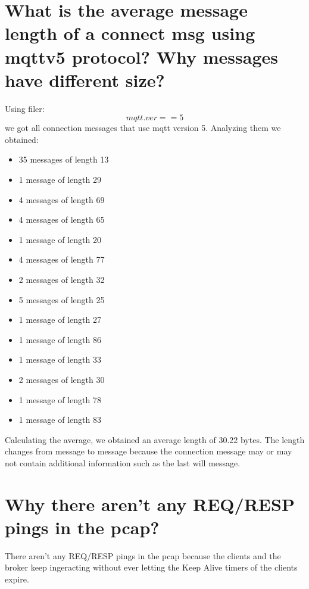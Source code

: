 \documentclass{article}
\begin{document}
\section{What is the average message length of a connect msg
using mqttv5 protocol? Why messages have different
size?}
Using filer: \[ mqtt.ver == 5\] we got all connection messages that use mqtt version 5. \hfill \break
Analyzing them we obtained: 
\begin{itemize} 
   \item 35 messages of length 13
   \item 1 message of length 29
   \item 4 messages of length 69
   \item 4 messages of length 65
   \item 1 message of length 20
   \item 4 messages of length 77
   \item 2 messages of length 32
   \item 5 messages of length 25
   \item 1 message of length 27
   \item 1 message of length 86
   \item 1 message of length 33
   \item 2 messages of length 30
   \item 1 message of length 78
   \item 1 message of length 83
\end{itemize}
Calculating the average, we obtained an average length of 30.22 bytes. \hfill \break
The length changes from message to message because the connection message may or may not contain additional information such as the last will message.

\section{Why there aren’t any REQ/RESP pings in the pcap?}
There aren't any REQ/RESP pings in the pcap because the clients and the broker keep ingeracting without ever letting the Keep Alive timers of the clients expire.
\end{document}
